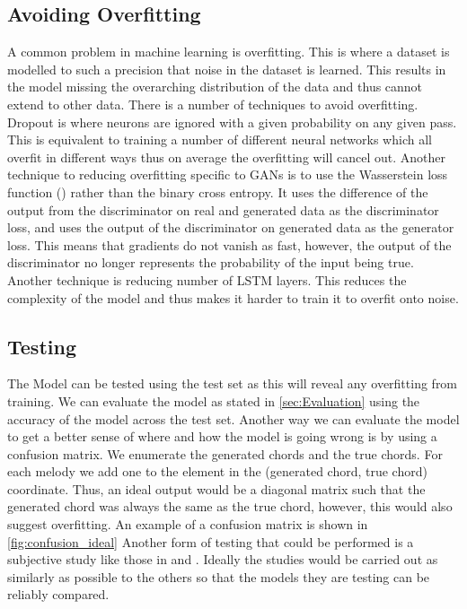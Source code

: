 \subsection{Avoiding Overfitting}
A common problem in machine learning is overfitting. This is where a dataset is modelled to such a precision that noise in the dataset is learned.
This results in the model missing the overarching distribution of the data and thus cannot extend to other data.
There is a number of techniques to avoid overfitting.
Dropout is where neurons are ignored with a given probability on any given pass. 
This is equivalent to training a number of different neural networks which all overfit in different ways thus on average the overfitting will cancel out.
Another technique to reducing overfitting specific to GANs is to use the Wasserstein loss function (\cite{Wasserstein}) rather than the binary cross entropy. 
It uses the difference of the output from the discriminator on real and generated data as the discriminator loss, and uses the output of the discriminator on generated data as the generator loss.
This means that gradients do not vanish as fast, however, the output of the discriminator no longer represents the probability of the input being true.
Another technique is reducing number of LSTM layers. 
This reduces the complexity of the model and thus makes it harder to train it to overfit onto noise.


\subsection{Testing}
The Model can be tested using the test set as this will reveal any overfitting from training. 
We can evaluate the model as stated in \cref{sec:Evaluation} using the accuracy of the model across the test set.
Another way we can evaluate the model to get a better sense of where and how the model is going wrong is by using a confusion matrix.
We enumerate the generated chords and the true chords. 
For each melody we add one to the element in the (generated chord, true chord) coordinate. 
Thus, an ideal output would be a diagonal matrix such that the generated chord was always the same as the true chord, however, this would also suggest overfitting.
An example of a confusion matrix is shown in \cref{fig:confusion_ideal}
Another form of testing that could be performed is a subjective study like those in  and .
Ideally the studies would be carried out as similarly as possible to the others so that the models they are testing can be reliably compared.


